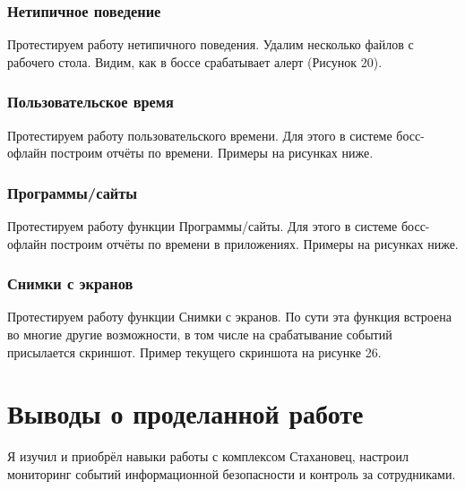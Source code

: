 \subsubsection{Нетипичное поведение}
Протестируем работу нетипичного поведения. Удалим несколько файлов с рабочего стола. Видим, как в боссе срабатывает алерт (Рисунок 20).
\FloatBarrier

\subsubsection{Пользовательское время}
Протестируем работу пользовательского времени. Для этого в системе босс-офлайн построим отчёты по времени. Примеры на рисунках ниже.
\FloatBarrier

\subsubsection{Программы/сайты}
Протестируем работу функции Программы/сайты. Для этого в системе босс-офлайн построим отчёты по времени в приложениях. Примеры на рисунках ниже.
\FloatBarrier

\subsubsection{Снимки с экранов}
Протестируем работу функции Снимки с экранов. По сути эта функция встроена во многие другие возможности, в том числе на срабатывание событий присылается скриншот. Пример текущего скриншота на рисунке 26.
\FloatBarrier
\clearpage

\section{Выводы о проделанной работе}
Я изучил и приобрёл навыки работы с комплексом Стахановец, настроил мониторинг событий информационной безопасности и контроль за сотрудниками. 

\clearpage